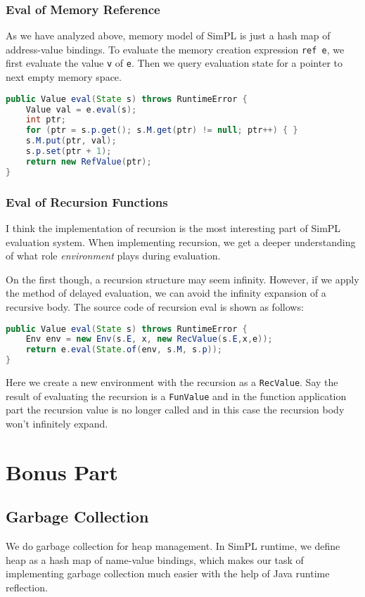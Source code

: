 \documentclass{article}
\begin{document}
\subsubsection{Eval of Memory Reference}
As we have analyzed above, memory model of SimPL is just a hash map of address-value bindings. To evaluate the memory creation expression \verb|ref e|, we first evaluate the value \verb|v| of \verb|e|. Then we query evaluation state for a pointer to next empty memory space.
\begin{lstlisting}[language=Java, caption=Evaluation of Ref]
public Value eval(State s) throws RuntimeError {
	Value val = e.eval(s);
	int ptr;
	for (ptr = s.p.get(); s.M.get(ptr) != null; ptr++) { }
	s.M.put(ptr, val);
	s.p.set(ptr + 1);
	return new RefValue(ptr);
}
\end{lstlisting}

\subsubsection{Eval of Recursion Functions}
I think the implementation of recursion is the most interesting part of SimPL evaluation system. When implementing recursion, we get a deeper understanding of what role \emph{environment} plays during evaluation. 

On the first though, a recursion structure may seem infinity. However, if we apply the method of delayed evaluation, we can avoid the infinity expansion of a recursive body. The source code of recursion eval is shown as follows:
\begin{lstlisting}[language=Java, caption=Evaluation of Rec]
public Value eval(State s) throws RuntimeError {
	Env env = new Env(s.E, x, new RecValue(s.E,x,e));
	return e.eval(State.of(env, s.M, s.p));
}
\end{lstlisting}
Here we create a new environment with the recursion as a \verb|RecValue|. Say the result of evaluating the recursion is a \verb|FunValue| and in the function application part the recursion value is no longer called and in this case the recursion body won't infinitely expand.


\section{Bonus Part}
\subsection{Garbage Collection}
We do garbage collection for heap management. In SimPL runtime, we define heap as a hash map of name-value bindings, which makes our task of implementing garbage collection much easier with the help of Java runtime reflection.
\end{document}
